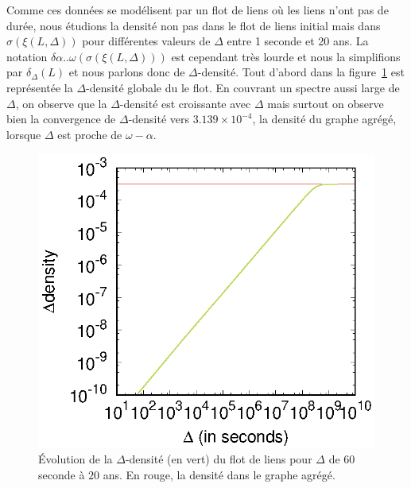 Comme ces données se modélisent par un flot de liens où les liens n'ont pas de durée, nous étudions la densité non pas dans le flot de liens initial mais dans $\sigma(\xi(L,\Delta))$  pour différentes valeurs de $\Delta$ entre 1 seconde et 20 ans.
La notation $\delta{\alpha..\omega}(\sigma(\xi(L,\Delta)))$ est cependant très lourde et nous la simplifions par $\delta_{\Delta}(L)$ et nous parlons donc de $\Delta$-densité.
Tout d'abord dans la figure~\ref{fig:dens_fil_discusion} est représentée la $\Delta$-densité globale du le flot.
En couvrant un spectre aussi large de $\Delta$, on observe que la $\Delta$-densité est croissante avec $\Delta$ mais surtout on observe bien la convergence de $\Delta$-densité vers $3.139\times 10^{-4}$, la densité du graphe agrégé, lorsque $\Delta$ est proche de $\omega - \alpha$.

\begin{figure}
	\centering
	\includegraphics[width=0.48\linewidth]{img/mailing/global_loglog.eps}
	\caption{Évolution de la $\Delta$-densité (en vert) du flot de liens pour $\Delta$ de $60$ seconde à $20$ ans. En rouge, la densité dans le graphe agrégé.}
	\label{fig:dens_fil_discusion}
\end{figure}

